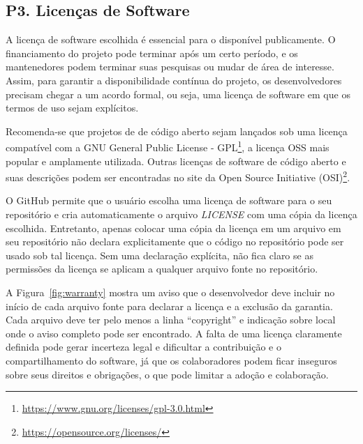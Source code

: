 \subsection*{P3. Licenças de Software} 



A licença de software escolhida é essencial para o \RSw disponível publicamente. O financiamento do projeto pode terminar após um certo período, e os mantenedores podem terminar suas pesquisas ou mudar de área de interesse. Assim, para garantir a disponibilidade contínua do projeto, os desenvolvedores precisam chegar a um acordo formal, ou seja, uma licença de software em que os termos de uso sejam explícitos.

Recomenda-se que projetos de \RSw de código aberto sejam lançados sob uma licença compatível com a GNU General Public License - GPL\footnote{\url{https://www.gnu.org/licenses/gpl-3.0.html}},
a licença OSS mais popular e amplamente utilizada.
Outras licenças de software de código aberto e suas descrições podem ser encontradas no site da Open Source Initiative (OSI)\footnote{\url{https://opensource.org/licenses/}}.

O GitHub permite que o usuário escolha uma licença de software para o seu repositório e cria automaticamente o arquivo \textit{LICENSE} com uma cópia da licença escolhida.
Entretanto, apenas colocar uma cópia da licença em um arquivo em seu repositório não declara explicitamente que o código no  repositório pode ser usado sob tal licença. 
Sem uma declaração explícita, não fica claro se as permissões da licença se aplicam a qualquer arquivo fonte no repositório.

A Figura~\ref{fig:warranty} mostra um aviso que o desenvolvedor deve incluir no início de cada arquivo fonte para declarar a licença e a exclusão da garantia. Cada arquivo deve ter pelo menos a linha ``copyright'' e indicação sobre local onde o aviso completo pode ser encontrado.
%
A falta de uma licença claramente definida pode gerar incerteza legal e dificultar a contribuição e o compartilhamento do software, já que os colaboradores podem ficar inseguros sobre seus direitos e obrigações, o que pode limitar a adoção e colaboração.


